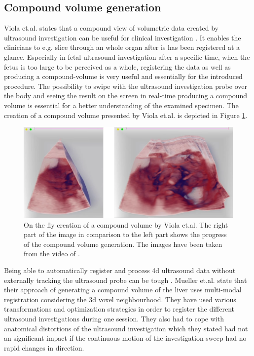 \newpage
\subsection{Compound volume generation}

Viola et.al. states that a compound view of volumetric data created by ultrasound investigation can be useful for clinical investigation \cite{Viola2013}. It enables the clinicians to e.g. slice through an whole organ after is has been registered at a glance. Especially in fetal ultrasound investigation after a specific time, when the fetus is too large to be perceived as a whole, registering the data as well as producing a compound-volume is very useful and essentially for the introduced procedure. The possibility to swipe with the ultrasound investigation probe over the body and seeing the result on the screen in real-time producing a compound volume is essential for a better understanding of the examined specimen. The creation of a compound volume presented by Viola et.al. is depicted in Figure \ref{fig:SwipeVol}.

\begin{figure} [htb!]
    \centering
	\includegraphics[width=12cm]{content/images/Swipevol}
	\caption{On the fly creation of a compound volume by Viola et.al. The right part of the image in comparison to the left part shows the progress of the compound volume generation. The images have been taken from the video of \cite{Viola2013}.}
	\label{fig:SwipeVol}
\end{figure}

Being able to automatically register and process \gls{4d} ultrasound data without externally tracking the ultrasound probe can be tough \cite{Muller2014}. Mueller et.al. state that their approach of generating a compound volume of the liver uses multi-modal registration considering the \gls{3d} voxel neighbourhood. They have used various transformations and optimization strategies in order to register the different ultrasound investigations during one session. They also had to cope with anatomical distortions of the ultrasound investigation which they stated had not an significant impact if the continuous motion of the investigation sweep had no rapid changes in direction.\newline\newline

